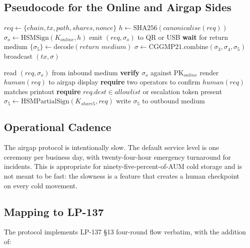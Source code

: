 \subsection{Pseudocode for the Online and Airgap Sides}

\begin{algorithm}
\caption{Online orchestrator side}
\begin{algorithmic}[1]
\State $req \gets \{chain, tx, path, shares, nonce\}$
\State $h \gets \mathrm{SHA256}(canonicalise(req))$
\State $\sigma_o \gets \mathrm{HSMSign}(K_{online}, h)$
\State emit $(req, \sigma_o)$ to QR or USB
\State \textbf{wait} for return medium
\State $\{\sigma_5\} \gets \mathrm{decode}(\textit{return medium})$
\State $\sigma \gets \mathrm{CGGMP21.combine}(\sigma_3, \sigma_4, \sigma_5)$
\State broadcast $(tx, \sigma)$
\end{algorithmic}
\end{algorithm}

\begin{algorithm}
\caption{Airgap side}
\begin{algorithmic}[1]
\State read $(req, \sigma_o)$ from inbound medium
\State \textbf{verify} $\sigma_o$ against $\mathrm{PK}_{online}$
\State render $human(req)$ to airgap display
\State \textbf{require} two operators to confirm $human(req)$ matches printout
\State \textbf{require} $req.dest \in allowlist$ or escalation token present
\State $\sigma_5 \gets \mathrm{HSMPartialSign}(K_{share5}, req)$
\State write $\sigma_5$ to outbound medium
\end{algorithmic}
\end{algorithm}

\subsection{Operational Cadence}

The airgap protocol is intentionally slow. The default service
level is one ceremony per business day, with twenty-four-hour
emergency turnaround for incidents. This is appropriate for
ninety-five-percent-of-AUM cold storage and is not meant to be
fast: the slowness is a feature that creates a human checkpoint on
every cold movement.

\subsection{Mapping to LP-137}

The protocol implements LP-137 \cite{lp137} \S13 four-round flow
verbatim, with the addition of:

